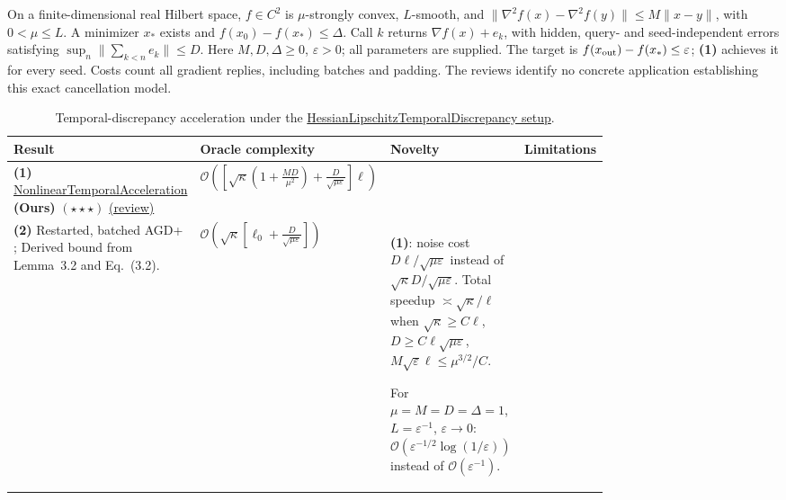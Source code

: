 \begin{table}[tp]
\centering
\caption{Temporal-discrepancy acceleration under the \href{https://github.com/k3nfalt/longtails/blob/main/LongTails/Setups/HessianLipschitzTemporalDiscrepancy.lean}{HessianLipschitzTemporalDiscrepancy setup}.}\label{tab:HessianLipschitzTemporalDiscrepancy}
\parbox{\linewidth}{\footnotesize On a finite-dimensional real Hilbert space, $f\in C^2$ is $\mu$-strongly convex, $L$-smooth, and $\|\nabla^2 f(x)-\nabla^2 f(y)\|\le M\|x-y\|$, with $0<\mu\le L$. A minimizer $x_*$ exists and $f(x_0)-f(x_*)\le\Delta$. Call $k$ returns $\nabla f(x)+e_k$, with hidden, query- and seed-independent errors satisfying $\sup_n\|\sum_{k<n}e_k\|\le D$. Here $M,D,\Delta\ge0$, $\varepsilon>0$; all parameters are supplied. The target is $f(x_{\rm out})-f(x_*)\le\varepsilon$; \textbf{(1)} achieves it for every seed. Costs count all gradient replies, including batches and padding. The reviews identify no concrete application establishing this exact cancellation model.}\par\smallskip
\begin{threeparttable}
\footnotesize
\setlength{\tabcolsep}{4pt}\renewcommand{\arraystretch}{1.25}
\begin{tabularx}{\linewidth}{@{}>{\raggedright\arraybackslash}p{0.20\linewidth}>{\raggedright\arraybackslash}p{0.32\linewidth}>{\raggedright\arraybackslash}p{0.25\linewidth}>{\raggedright\arraybackslash}X@{}}
\toprule
\textbf{Result} & \textbf{Oracle complexity} & \textbf{Novelty} & \textbf{Limitations} \\
\midrule
\textbf{(1)} \href{https://github.com/k3nfalt/longtails/blob/main/LongTails/Theorems/NonlinearTemporalAcceleration.lean}{Nonlinear\allowbreak Temporal\allowbreak Acceleration} \textbf{(Ours)} $(\star\star\star)$ \href{https://github.com/k3nfalt/longtails/blob/main/scripts/reviews/NonlinearTemporalAcceleration.md}{(review)}
& $\displaystyle\mathcal{O}\!\left(\left[\sqrt{\kappa}\left(1+\frac{MD}{\mu^2}\right)+\frac{D}{\sqrt{\mu\varepsilon}}\right]\ell\right)$
& & \\
\midrule[1.2pt]
\textbf{(2)} Restarted, batched AGD+ \citep{hltCohen2018}; Derived bound from Lemma~3.2 and Eq.~(3.2).
& $\displaystyle\mathcal{O}\!\left(\sqrt{\kappa}\left[\ell_0+\frac{D}{\sqrt{\mu\varepsilon}}\right]\right)$
& \textbf{(1)}: noise cost $D\ell/\sqrt{\mu\varepsilon}$ instead of $\sqrt{\kappa}D/\sqrt{\mu\varepsilon}$. Total speedup $\asymp\sqrt{\kappa}/\ell$ when $\sqrt{\kappa}\ge C\ell$, $D\ge C\ell\sqrt{\mu\varepsilon}$, $M\sqrt{\varepsilon}\ell\le\mu^{3/2}/C$.\par For $\mu=M=D=\Delta=1$, $L=\varepsilon^{-1}$, $\varepsilon\to0$: $\mathcal{O}(\varepsilon^{-1/2}\log(1/\varepsilon))$ instead of $\mathcal{O}(\varepsilon^{-1})$.

\end{tabularx}
\end{threeparttable}
\end{table}
